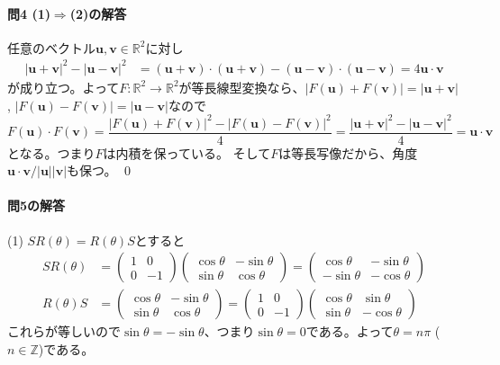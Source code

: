 \paragraph{問4 (1)$\Rightarrow$(2)の解答} 任意のベクトル$\bm{u}, \bm{v} \in \mathbb{R}^2$に対し
\begin{align*}
|\bm{u} + \bm{v}|^2 - |\bm{u} - \bm{v}|^2
&= (\bm{u} + \bm{v})\cdot(\bm{u} + \bm{v}) - (\bm{u} - \bm{v})\cdot(\bm{u} - \bm{v}) = 4\bm{u}\cdot\bm{v}
\end{align*}
が成り立つ。よって$F\colon\mathbb{R}^2\rightarrow\mathbb{R}^2$が等長線型変換なら、$|F(\bm{u}) + F(\bm{v})| = |\bm{u} + \bm{v}|$, $|F(\bm{u}) - F(\bm{v})| = |\bm{u} - \bm{v}|$なので
\[
F(\bm{u})\cdot F(\bm{v}) = \frac{|F(\bm{u}) + F(\bm{v})|^2 - |F(\bm{u}) - F(\bm{v})|^2}{4}
= \frac{|\bm{u} + \bm{v}|^2 - |\bm{u} - \bm{v}|^2}{4} = \bm{u}\cdot\bm{v}
\]
となる。つまり$F$は内積を保っている。 そして$F$は等長写像だから、角度$\bm{u}\cdot\bm{v}/|\bm{u}||\bm{v}|$も保つ。 \qed

\paragraph{問5の解答}

(1) $SR(\theta) = R(\theta)S$とすると
\begin{align*}
SR(\theta) &= 
\begin{pmatrix}
1 & 0 \\
0 & -1
\end{pmatrix}
\begin{pmatrix}
\cos\theta & -\sin\theta \\
\sin\theta & \cos\theta
\end{pmatrix}
=
\begin{pmatrix}
\cos\theta & -\sin\theta \\
-\sin\theta & -\cos\theta
\end{pmatrix}\\
R(\theta) S &= 
\begin{pmatrix}
\cos\theta & -\sin\theta \\
\sin\theta & \cos\theta
\end{pmatrix} =
\begin{pmatrix}
1 & 0 \\
0 & -1
\end{pmatrix}
\begin{pmatrix}
\cos\theta & \sin\theta \\
\sin\theta & -\cos\theta
\end{pmatrix}
\end{align*}
これらが等しいので$\sin\theta = -\sin\theta$、つまり$\sin\theta = 0$である。よって$\theta = n\pi$ ($n\in\mathbb{Z}$)である。

